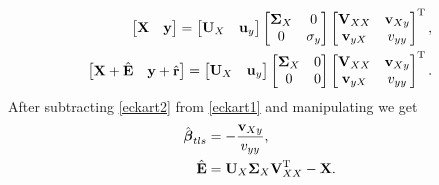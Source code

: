 \begin{align}
\begin{bmatrix} \boldsymbol{\mathrm{X}} & \boldsymbol{\mathrm{y}} \end{bmatrix} = \begin{bmatrix} \boldsymbol{\mathrm{U}}_{X} & \boldsymbol{\mathrm{u}}_{y} \end{bmatrix} \begin{bmatrix} \boldsymbol{\mathrm{\Sigma}}_{X} & 0 \\ 0 & \sigma_{y} \end{bmatrix} \begin{bmatrix} \boldsymbol{\mathrm{V}}_{XX} & \boldsymbol{\mathrm{v}}_{Xy} \\ \boldsymbol{\mathrm{v}}_{yX} & v_{yy} \end{bmatrix}^{\mathrm{T}}, \label{eckart1} \\
\begin{bmatrix} \boldsymbol{\mathrm{X}} + \hat{\boldsymbol{\mathrm{E}}} & \boldsymbol{\mathrm{y}} + \hat{\boldsymbol{\mathrm{r}}} \end{bmatrix} = \begin{bmatrix} \boldsymbol{\mathrm{U}}_{X} & \boldsymbol{\mathrm{u}}_{y} \end{bmatrix} \begin{bmatrix} \boldsymbol{\mathrm{\Sigma}}_{X} & 0 \\ 0 & 0 \end{bmatrix} \begin{bmatrix} \boldsymbol{\mathrm{V}}_{XX} & \boldsymbol{\mathrm{v}}_{Xy} \\ \boldsymbol{\mathrm{v}}_{yX} & v_{yy} \end{bmatrix}^{\mathrm{T}} \label{eckart2}.
\end{align}
% 
\noindent After subtracting \eqref{eckart2} from \eqref{eckart1} and manipulating we get
%
\begin{align}
\hat{\boldsymbol{\mathrm{\beta}}}_{tls} &= -\frac{\boldsymbol{\mathrm{v}}_{Xy}}{v_{yy}}, \label{tls1} \\
\hat{\boldsymbol{\mathrm{E}}} &= \boldsymbol{\mathrm{U}}_{X} \boldsymbol{\mathrm{\Sigma}}_{X} \boldsymbol{\mathrm{V}}_{XX}^{\mathrm{T}} - \boldsymbol{\mathrm{X}}. \label{tls2}
\end{align}

